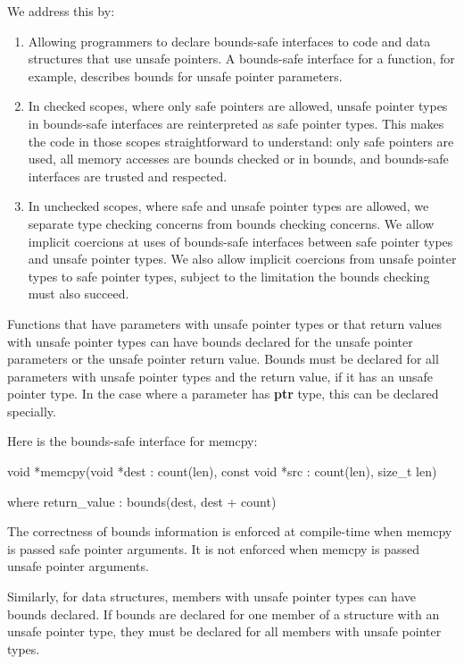We address this by:

\begin{enumerate}
\def\labelenumi{\arabic{enumi}.}
\item
  Allowing programmers to declare bounds-safe interfaces to code and
  data structures that use unsafe pointers. A bounds-safe interface for
  a function, for example, describes bounds for unsafe pointer
  parameters.
\item
  In checked scopes, where only safe pointers are allowed, unsafe
  pointer types in bounds-safe interfaces are reinterpreted as safe
  pointer types. This makes the code in those scopes straightforward to
  understand: only safe pointers are used, all memory accesses are
  bounds checked or in bounds, and bounds-safe interfaces are trusted
  and respected.
\item
  In unchecked scopes, where safe and unsafe pointer types are allowed,
  we separate type checking concerns from bounds checking concerns. We
  allow implicit coercions at uses of bounds-safe interfaces between
  safe pointer types and unsafe pointer types. We also allow implicit
  coercions from unsafe pointer types to safe pointer types, subject to
  the limitation the bounds checking must also succeed.
\end{enumerate}

Functions that have parameters with unsafe pointer types or that return
values with unsafe pointer types can have bounds declared for the unsafe
pointer parameters or the unsafe pointer return value. Bounds must be
declared for all parameters with unsafe pointer types and the return
value, if it has an unsafe pointer type. In the case where a parameter
has \textbf{ptr} type, this can be declared specially.

Here is the bounds-safe interface for memcpy:

void *memcpy(void *dest : count(len), const void *src : count(len),
size\_t len)

where return\_value : bounds(dest, dest + count)

The correctness of bounds information is enforced at compile-time when
memcpy is passed safe pointer arguments. It is not enforced when memcpy
is passed unsafe pointer arguments.

Similarly, for data structures, members with unsafe pointer types can
have bounds declared. If bounds are declared for one member of a
structure with an unsafe pointer type, they must be declared for all
members with unsafe pointer types.

